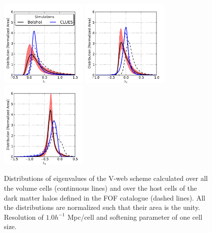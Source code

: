 \begin{figure}[htbp]
	\centering
	\includegraphics[width=0.38\textwidth]
	{./figures/4_results/Cells_Distro_L1.pdf}
	\includegraphics[width=0.38\textwidth]
	{./figures/4_results/Cells_Distro_L2.pdf}
	\includegraphics[width=0.38\textwidth]
	{./figures/4_results/Cells_Distro_L3.pdf}

	\caption{\small{ Distributions of eigenvalues of the V-web scheme 
	calculated over all the volume cells (continuous lines) and over the 
	host cells of the dark matter halos defined in the FOF catalogue (dashed 
	lines). All the distributions are normalized such that their area is
	the unity. Resolution of $1.0 h^{-1}$ Mpc/cell and softening parameter
	of one cell size.}}
	\label{fig:1D_Cells_Eigenvalues}
\end{figure}



